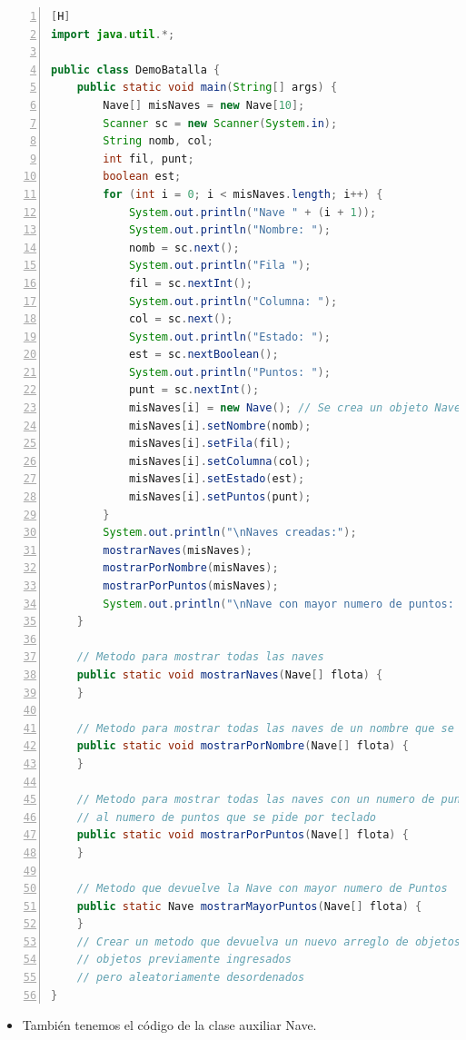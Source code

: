 \documentclass{article}
\begin{document}
	\begin{lstlisting}[language=java,caption={Código parcial de DemoBatalla}, numbers=left][H]
import java.util.*;

public class DemoBatalla {
    public static void main(String[] args) {
        Nave[] misNaves = new Nave[10];
        Scanner sc = new Scanner(System.in);
        String nomb, col;
        int fil, punt;
        boolean est;
        for (int i = 0; i < misNaves.length; i++) {
            System.out.println("Nave " + (i + 1));
            System.out.println("Nombre: ");
            nomb = sc.next();
            System.out.println("Fila ");
            fil = sc.nextInt();
            System.out.println("Columna: ");
            col = sc.next();
            System.out.println("Estado: ");
            est = sc.nextBoolean();
            System.out.println("Puntos: ");
            punt = sc.nextInt();
            misNaves[i] = new Nave(); // Se crea un objeto Nave y se asigna su referencia a misNaves
            misNaves[i].setNombre(nomb);
            misNaves[i].setFila(fil);
            misNaves[i].setColumna(col);
            misNaves[i].setEstado(est);
            misNaves[i].setPuntos(punt);
        }
        System.out.println("\nNaves creadas:");
        mostrarNaves(misNaves);
        mostrarPorNombre(misNaves);
        mostrarPorPuntos(misNaves);
        System.out.println("\nNave con mayor numero de puntos: " + mostrarMayorPuntos(misNaves));
    }

    // Metodo para mostrar todas las naves
    public static void mostrarNaves(Nave[] flota) {
    }

    // Metodo para mostrar todas las naves de un nombre que se pide por teclado
    public static void mostrarPorNombre(Nave[] flota) {
    }

    // Metodo para mostrar todas las naves con un numero de puntos inferior o igual
    // al numero de puntos que se pide por teclado
    public static void mostrarPorPuntos(Nave[] flota) {
    }

    // Metodo que devuelve la Nave con mayor numero de Puntos
    public static Nave mostrarMayorPuntos(Nave[] flota) {
    }
    // Crear un metodo que devuelva un nuevo arreglo de objetos con todos los
    // objetos previamente ingresados
    // pero aleatoriamente desordenados
}
	\end{lstlisting}
	\begin{itemize}	
		\item También tenemos el código de la clase auxiliar Nave. 
	\end{itemize}
\end{document}
